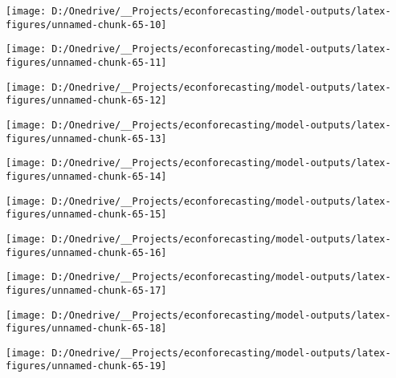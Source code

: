 \documentclass[11pt, letterpaper]{article}\usepackage[]{graphicx}\usepackage[]{color}
\begin{document}
{\centering \texttt{[image: D:/Onedrive/\_\_Projects/econforecasting/model-outputs/latex-figures/unnamed-chunk-65-10]} 

}




{\centering \texttt{[image: D:/Onedrive/\_\_Projects/econforecasting/model-outputs/latex-figures/unnamed-chunk-65-11]} 

}




{\centering \texttt{[image: D:/Onedrive/\_\_Projects/econforecasting/model-outputs/latex-figures/unnamed-chunk-65-12]} 

}




{\centering \texttt{[image: D:/Onedrive/\_\_Projects/econforecasting/model-outputs/latex-figures/unnamed-chunk-65-13]} 

}




{\centering \texttt{[image: D:/Onedrive/\_\_Projects/econforecasting/model-outputs/latex-figures/unnamed-chunk-65-14]} 

}




{\centering \texttt{[image: D:/Onedrive/\_\_Projects/econforecasting/model-outputs/latex-figures/unnamed-chunk-65-15]} 

}




{\centering \texttt{[image: D:/Onedrive/\_\_Projects/econforecasting/model-outputs/latex-figures/unnamed-chunk-65-16]} 

}




{\centering \texttt{[image: D:/Onedrive/\_\_Projects/econforecasting/model-outputs/latex-figures/unnamed-chunk-65-17]} 

}




{\centering \texttt{[image: D:/Onedrive/\_\_Projects/econforecasting/model-outputs/latex-figures/unnamed-chunk-65-18]} 

}




{\centering \texttt{[image: D:/Onedrive/\_\_Projects/econforecasting/model-outputs/latex-figures/unnamed-chunk-65-19]} 

}
\end{document}
